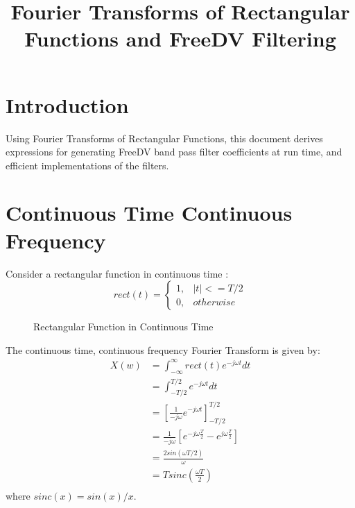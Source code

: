 \documentclass{article}
\begin{document}
\title{Fourier Transforms of Rectangular Functions and FreeDV Filtering}
\maketitle

\section{Introduction}

Using Fourier Transforms of Rectangular Functions, this document derives expressions for generating FreeDV band pass filter coefficients at run time, and efficient implementations of the filters.

\section{Continuous Time Continuous Frequency}

Consider a rectangular function in continuous time \cite{wikipedia_rect}:
\begin{equation}
rect(t)= 
	\begin{cases}
      1, & |t| <= T/2 \\
      0, & otherwise
	\end{cases}
\end{equation}

\begin{figure}[h]
\caption{Rectangular Function in Continuous Time}
\vspace{5mm}
\label{fig:rect_time}
\centering
{}
\end{figure}

The continuous time, continuous frequency Fourier Transform is given by:
\begin{equation} \label{eq:ctcf}
\begin{split}
X(w) &= \int_{-\infty}^{\infty} rect(t)e^{-j \omega t} dt\\
     &= \int_{-T/2}^{T/2} e^{-j \omega t} dt \\
     &= \left[ \frac{1}{-j \omega} e^{-j \omega t} \right]_{-T/2}^{T/2} \\
     &= \frac{1}{-j \omega} \left[  e^{-j \omega \frac{T}{2}} - e^{j \omega \frac{T}{2}} \right] \\
     &= \frac{2 sin(\omega T/2)}{\omega} \\
     &= T sinc \left( \frac{\omega T}{2} \right) \\
\end{split}
\end{equation}
where $sinc(x) = sin(x)/x$.    
\end{document}
